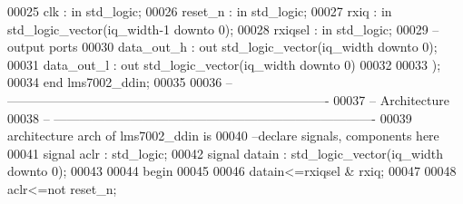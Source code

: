\begin{DoxyCode}
00025       \textcolor{vhdlchar}{clk}           \textcolor{vhdlchar}{:} \textcolor{keywordflow}{in} \textcolor{comment}{std\_logic};
00026       \textcolor{vhdlchar}{reset_n}       \textcolor{vhdlchar}{:} \textcolor{keywordflow}{in} \textcolor{comment}{std\_logic};
00027         \textcolor{vhdlchar}{rxiq}            \textcolor{vhdlchar}{:} \textcolor{keywordflow}{in} \textcolor{comment}{std\_logic\_vector}\textcolor{vhdlchar}{(}\textcolor{vhdlchar}{iq_width}\textcolor{vhdlchar}{-}\textcolor{vhdllogic}{}\textcolor{vhdllogic}{1} \textcolor{keywordflow}{downto} \textcolor{vhdllogic}{}\textcolor{vhdllogic}{0}\textcolor{vhdlchar}{)};
00028         \textcolor{vhdlchar}{rxiqsel}     \textcolor{vhdlchar}{:} \textcolor{keywordflow}{in} \textcolor{comment}{std\_logic};
00029 \textcolor{keyword}{        --output ports }
00030         \textcolor{vhdlchar}{data_out_h}  \textcolor{vhdlchar}{:} \textcolor{keywordflow}{out} \textcolor{comment}{std\_logic\_vector}\textcolor{vhdlchar}{(}\textcolor{vhdlchar}{iq_width} \textcolor{keywordflow}{downto} \textcolor{vhdllogic}{}\textcolor{vhdllogic}{0}\textcolor{vhdlchar}{)};
00031         \textcolor{vhdlchar}{data_out_l}  \textcolor{vhdlchar}{:} \textcolor{keywordflow}{out} \textcolor{comment}{std\_logic\_vector}\textcolor{vhdlchar}{(}\textcolor{vhdlchar}{iq_width} \textcolor{keywordflow}{downto} \textcolor{vhdllogic}{}\textcolor{vhdllogic}{0}\textcolor{vhdlchar}{)}
00032         
00033         \textcolor{vhdlchar}{)};
00034 \textcolor{keywordflow}{end} \textcolor{vhdlchar}{lms7002\_ddin};
00035 
00036 \textcolor{keyword}{-- ----------------------------------------------------------------------------}
00037 \textcolor{keyword}{-- Architecture}
00038 \textcolor{keyword}{-- ----------------------------------------------------------------------------}
00039 \textcolor{keywordflow}{architecture} arch \textcolor{keywordflow}{of} lms7002_ddin is
00040 \textcolor{keyword}{--declare signals,  components here}
00041 \textcolor{keywordflow}{signal} \textcolor{vhdlchar}{aclr}     \textcolor{vhdlchar}{:} \textcolor{comment}{std\_logic};
00042 \textcolor{keywordflow}{signal} \textcolor{vhdlchar}{datain}   \textcolor{vhdlchar}{:} \textcolor{comment}{std\_logic\_vector}\textcolor{vhdlchar}{(}\textcolor{vhdlchar}{iq_width} \textcolor{keywordflow}{downto} \textcolor{vhdllogic}{}\textcolor{vhdllogic}{0}\textcolor{vhdlchar}{)};
00043 
00044 \textcolor{vhdlkeyword}{begin}
00045 
00046 \textcolor{vhdlchar}{datain}\textcolor{vhdlchar}{<=}\textcolor{vhdlchar}{rxiqsel} \textcolor{vhdlchar}{&} \textcolor{vhdlchar}{rxiq};
00047 
00048 \textcolor{vhdlchar}{aclr}\textcolor{vhdlchar}{<=}\textcolor{keywordflow}{not} \textcolor{vhdlchar}{reset_n};

\end{DoxyCode}
